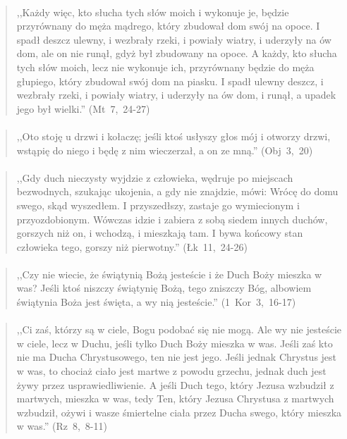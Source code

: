 \documentclass[10pt,a4paper,oneside]{article}
\begin{document}
\paragraph{}
\begin{quote}
,,Każdy więc, kto słucha tych słów moich i wykonuje je, będzie przyrównany do męża mądrego, który zbudował dom swój na opoce. I spadł deszcz ulewny, i wezbrały rzeki, i powiały wiatry, i uderzyły na ów dom, ale on nie runął, gdyż był zbudowany na opoce. A każdy, kto słucha tych słów moich, lecz nie wykonuje ich, przyrównany będzie do męża głupiego, który zbudował swój dom na piasku. I spadł ulewny deszcz, i wezbrały rzeki, i powiały wiatry, i uderzyły na ów dom, i runął, a upadek jego był wielki.'' \mbox{(Mt 7, 24-27)}
\end{quote}
\paragraph{}
\begin{quote}
,,Oto stoję u drzwi i kołaczę; jeśli ktoś usłyszy głos mój i otworzy drzwi, wstąpię do niego i będę z nim wieczerzał, a on ze mną.'' \mbox{(Obj 3, 20)}
\end{quote}
\paragraph{}
\begin{quote}
,,Gdy duch nieczysty wyjdzie z człowieka, wędruje po miejscach bezwodnych, szukając ukojenia, a gdy nie znajdzie, mówi: Wrócę do domu swego, skąd wyszedłem. I przyszedłszy, zastaje go wymiecionym i przyozdobionym. Wówczas idzie i zabiera z sobą siedem innych duchów, gorszych niż on, i wchodzą, i mieszkają tam. I bywa końcowy stan człowieka tego, gorszy niż pierwotny.'' \mbox{(Łk 11, 24-26)}
\end{quote}
\paragraph{}
\begin{quote}
,,Czy nie wiecie, że świątynią Bożą jesteście i że Duch Boży mieszka w was? Jeśli ktoś niszczy świątynię Bożą, tego zniszczy Bóg, albowiem świątynia Boża jest święta, a wy nią jesteście.'' \mbox{(1 Kor 3, 16-17)}
\end{quote}
\paragraph{}
\begin{quote}
,,Ci zaś, którzy są w ciele, Bogu podobać się nie mogą. Ale wy nie jesteście w ciele, lecz w Duchu, jeśli tylko Duch Boży mieszka w was. Jeśli zaś kto nie ma Ducha Chrystusowego, ten nie jest jego. Jeśli jednak Chrystus jest w was, to chociaż ciało jest martwe z powodu grzechu, jednak duch jest żywy przez usprawiedliwienie. A jeśli Duch tego, który Jezusa wzbudził z martwych, mieszka w was, tedy Ten, który Jezusa Chrystusa z martwych wzbudził, ożywi i wasze śmiertelne ciała przez Ducha swego, który mieszka w was.'' \mbox{(Rz 8, 8-11)}
\end{quote}
\end{document}
